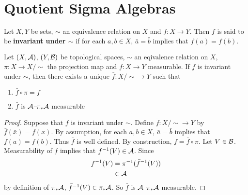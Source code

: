 \documentclass{book}
\begin{document}
	
	
	
	
	\newpage
	\section{Quotient Sigma Algebras}
	\begin{defn}
		Let $X,Y$ be sets, $\sim$ an equivalence relation on $X$ and $f: X \rightarrow Y$. Then $f$ is said to be \textbf{invariant under $\sim$} if for each $a,b \in X$, $\bar{a} = \bar{b}$ implies that $f(a) = f(b)$. 
	\end{defn}
	
	\begin{ex} \lex{}
		Let $(X, \mathcal{A})$, $(Y, \mathcal{B})$ be topological spaces, $\sim$ an eqivalence relation on $X$, $\pi:X \rightarrow X/\sim$ the projection map and $f:X \rightarrow Y$ measurable. If $f$ is invariant under $\sim$, then there exists a unique $\bar{f}:X / {\sim} \rightarrow Y$ such that 
		\begin{enumerate}
			\item $\bar{f} \circ \pi = f$
			\item $\bar{f}$ is $\mathcal{A}$-$\pi_*\mathcal{A}$ measurable 
		\end{enumerate}
	\end{ex}
	
	\begin{proof}
		Suppose that $f$ is invariant under $\sim$. Define $\bar{f}: X / {\sim} \rightarrow Y$ by $\bar{f}(\bar{x}) = f(x)$. By assumption, for each $a, b \in X$, $\bar{a} = \bar{b}$ implies that $f(a) = f(b)$. Thus $\bar{f}$ is well defined. By construction, $f = \bar{f} \circ \pi$. Let $V \in \mathcal{B}$. Measurability of $f$ implies that $f^{-1}(V) \in \mathcal{A}$. Since 
		\begin{align*}
			f^{-1}(V)
			&= \pi^{-1}(\bar{f}^{-1}(V)) \\
			& \in \mathcal{A}
		\end{align*}
		by definition of $\pi_*\mathcal{A}$, $\bar{f}^{-1}(V) \in \pi_*\mathcal{A}$. So $\bar{f}$ is $\mathcal{A}$-$\pi_*\mathcal{A}$ measurable.
	\end{proof}
	
	
	
	
	
	
	
	
	
	
	
	
	
	
	
	
	
	
	
	
	
\end{document}
